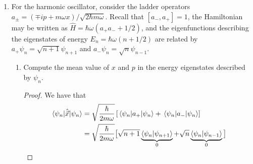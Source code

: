 \documentclass[../psets.tex]{subfiles}
\begin{document}
\begin{enumerate}
\begin{enumerate}
\begin{proof}
\begin{align*}
                \ev{\hat{p}}{\psi_1} &= 0\\
                \ev{\hat{p}^2}{\psi_1} &= \frac{3\hbar m\omega}{2}
            \end{align*}
            Thus,
            \begin{equation*}
                \sigma_x^2 = \left( x_\text{eq}^2+\frac{3\hbar}{2m\omega}+4x_\text{eq}\sqrt{\frac{\hbar}{m\omega\pi}} \right)-\left( 2\sqrt{\frac{\hbar}{m\omega\pi}}+x_\text{eq} \right)^2
                    = \frac{3\hbar}{2m\omega}-\frac{4\hbar}{m\omega\pi}
            \end{equation*}
            and
            \begin{equation*}
                \sigma_p^2 = \frac{3\hbar m\omega}{2}
            \end{equation*}
            so
            \begin{equation*}
                \sigma_x\sigma_p = \sqrt{\left( \frac{3\hbar}{2m\omega}-\frac{4\hbar}{m\omega\pi} \right)\left( \frac{3\hbar m\omega}{2} \right)}
                    = \hbar\sqrt{\frac{9}{4}-\frac{6}{\pi}}
                    \approx 0.58\hbar
            \end{equation*}
            Since $0.58\hbar\neq\hbar/2$ (the answer to Q1d),  $\sigma_x\sigma_p$ is not the same as in the system without the wall.
        \end{proof}
    \end{enumerate}
    \item For the harmonic oscillator, consider the ladder operators $a_\pm=(\mp ip+m\omega x)/\sqrt{2\hbar m\omega}$. Recall that $[a_-,a_+]=1$, the Hamiltonian may be written as $\hat{H}=\hbar\omega(a_+a_-+1/2)$, and the eigenfunctions describing the eigenstates of energy $E_n=\hbar\omega(n+1/2)$ are related by $a_+\psi_n=\sqrt{n+1}\psi_{n+1}$ and $a_-\psi_n=\sqrt{n}\psi_{n-1}$.
    \begin{enumerate}
        \item Compute the mean value of $x$ and $p$ in the energy eigenstates described by $\psi_n$.
        \begin{proof}
            We have that
            \begin{align*}
                \ev{\hat{\vec{x}}}{\psi_n} &= \sqrt{\frac{\hbar}{2m\omega}}\left[ \ev{a_+}{\psi_n}+\ev{a_-}{\psi_n} \right]\\
                &= \sqrt{\frac{\hbar}{2m\omega}}\big[ \sqrt{n+1}\underbrace{\braket{\psi_n}{\psi_{n+1}}}_0+\sqrt{n}\underbrace{\braket{\psi_n}{\psi_{n-1}}}_0 \big]\\

\end{align*}
\end{proof}
\end{enumerate}
\end{enumerate}
\end{document}
